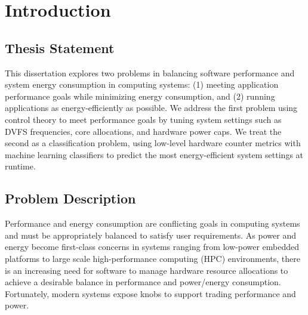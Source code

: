 \chapter{Introduction}
\label{sec:intro}

\section{Thesis Statement}

This dissertation explores two problems in balancing software performance and system energy consumption in computing systems: (1) meeting application performance goals while minimizing energy consumption, and (2) running applications as energy-efficiently as possible.
We address the first problem using control theory to meet performance goals by tuning system settings such as DVFS frequencies, core allocations, and hardware power caps.
We treat the second as a classification problem, using low-level hardware counter metrics with machine learning classifiers to predict the most energy-efficient system settings at runtime.


\section{Problem Description}
\label{sec:intro-description}

Performance and energy consumption are conflicting goals in computing systems and must be appropriately balanced to satisfy user requirements.
As power and energy become first-class concerns in systems ranging from low-power embedded platforms to large scale high-performance computing (HPC) environments, there is an increasing need for software to manage hardware resource allocations to achieve a desirable balance in performance and power/energy consumption.
Fortunately, modern systems expose knobs to support trading performance and power.

